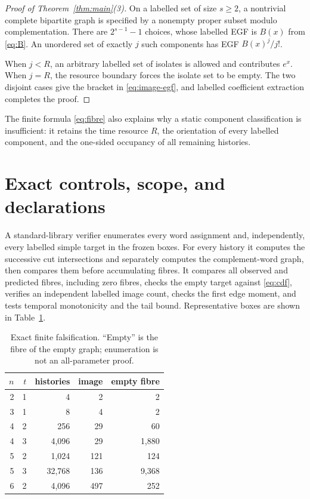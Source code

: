 \documentclass[a4paper,10pt]{amsart}
\theoremstyle{remark}
\begin{document}
\begin{proof}[Proof of Theorem~\ref{thm:main}(3)]
On a labelled set of size $s\geq2$, a nontrivial complete bipartite graph is
specified by a nonempty proper subset modulo complementation.  There are
$2^{s-1}-1$ choices, whose labelled EGF is $B(x)$ from \eqref{eq:B}.
An unordered set of exactly $j$ such components has EGF $B(x)^j/j!$.

When $j<R$, an arbitrary labelled set of isolates is allowed and contributes
$e^x$.  When $j=R$, the resource boundary forces the isolate set to be empty.
The two disjoint cases give the bracket in \eqref{eq:image-egf}, and labelled
coefficient extraction completes the proof.
\end{proof}

The finite formula \eqref{eq:fibre} also explains why a static component
classification is insufficient: it retains the time resource $R$, the
orientation of every labelled component, and the one-sided occupancy of all
remaining histories.

\section{Exact controls, scope, and declarations}\label{sec:audit}

A standard-library verifier enumerates every word assignment and,
independently, every labelled simple target in the frozen boxes.  For every
history it computes the successive cut intersections and separately computes
the complement-word graph, then compares them before accumulating fibres.  It
compares all observed and predicted fibres, including zero fibres, checks the
empty target against \eqref{eq:cdf}, verifies an independent labelled image
count, checks the first edge moment, and tests temporal monotonicity and the
tail bound.  Representative boxes are shown in Table~\ref{tab:audit}.

\begin{table}[ht]
\centering
\small
\caption{Exact finite falsification.  ``Empty'' is the fibre of the empty
graph; enumeration is not an all-parameter proof.}
\label{tab:audit}
\begin{tabular}{@{}rrrrr@{}}
\toprule
$n$ & $t$ & histories & image & empty fibre \\
\midrule
2&1&4&2&2\\
3&1&8&4&2\\
4&2&256&29&60\\
4&3&4,096&29&1,880\\
5&2&1,024&121&124\\
5&3&32,768&136&9,368\\
6&2&4,096&497&252\\
\bottomrule
\end{tabular}
\end{table}
\end{document}
